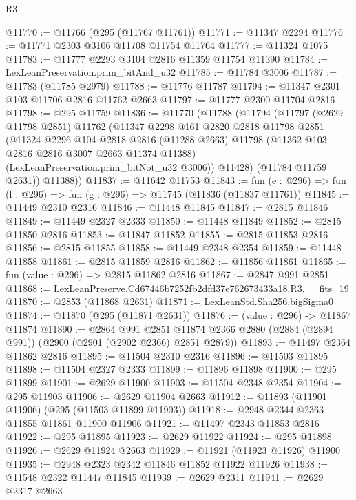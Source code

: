 \begin{lexlean}{R3}
\begin{coremodule}
@11770 := @11766 (@295 (@11767 @11761))
@11771 := @11347 @2294
@11776 := @11771 @2303 @3106 @11708 @11754 @11764
@11777 := @11324 @1075
@11783 := @11777 @2293 @3104 @2816 @11359 @11754 @11390
@11784 := LexLeanPreservation.prim_bitAnd_u32
@11785 := @11784 @3006
@11787 := @11783 (@11785 @2979)
@11788 := @11776 @11787
@11794 := @11347 @2301 @103 @11706 @2816 @11762 @2663
@11797 := @11777 @2300 @11704 @2816
@11798 := @295 @11759
@11836 := @11770
    (@11788
      (@11794
        (@11797
          (@2629 @11798 @2851)
          @11762
          (@11347
            @2298
            @161
            @2820
            @2818
            @11798
            @2851
            (@11324
              @2296
              @104
              @2818
              @2816
              (@11288 @2663)
              @11798
              (@11362 @103 @2816 @2816 @3007 @2663 @11374 @11388)
              (LexLeanPreservation.prim_bitNot_u32 @3006))
            @11428)
          (@11784 @11759 @2631))
        @11388))
@11837 := @11642 @11753
@11843 := fun (e : @296) => fun (f : @296) => fun (g : @296) => @11745 (@11836 (@11837 @11761))
@11845 := @11449 @2310 @2316
@11846 := @11448 @11845
@11847 := @2815 @11846
@11849 := @11449 @2327 @2333
@11850 := @11448 @11849
@11852 := @2815 @11850 @2816
@11853 := @11847 @11852
@11855 := @2815 @11853 @2816
@11856 := @2815 @11855
@11858 := @11449 @2348 @2354
@11859 := @11448 @11858
@11861 := @2815 @11859 @2816
@11862 := @11856 @11861
@11865 := fun (value : @296) => @2815 @11862 @2816
@11867 := @2847 @991 @2851
@11868 := LexLeanPreserve.Cd67446b7252fb2dfd37e762673433a18.R3.__fits_19
@11870 := @2853 (@11868 @2631)
@11871 := LexLeanStd.Sha256.bigSigma0
@11874 := @11870 (@295 (@11871 @2631))
@11876 := (value : @296) -> @11867 @11874
@11890 := @2864
    @991
    @2851
    @11874
    @2366
    @2880
    (@2884 (@2894 @991))
    (@2900 (@2901 (@2902 @2366) @2851 @2879))
@11893 := @11497 @2364 @11862 @2816
@11895 := @11504 @2310 @2316
@11896 := @11503 @11895
@11898 := @11504 @2327 @2333
@11899 := @11896 @11898
@11900 := @295 @11899
@11901 := @2629 @11900
@11903 := @11504 @2348 @2354
@11904 := @295 @11903
@11906 := @2629 @11904 @2663
@11912 := @11893 (@11901 @11906) (@295 (@11503 @11899 @11903))
@11918 := @2948 @2344 @2363 @11855 @11861 @11900 @11906
@11921 := @11497 @2343 @11853 @2816
@11922 := @295 @11895
@11923 := @2629 @11922
@11924 := @295 @11898
@11926 := @2629 @11924 @2663
@11929 := @11921 (@11923 @11926) @11900
@11935 := @2948 @2323 @2342 @11846 @11852 @11922 @11926
@11938 := @11548 @2322 @11447 @11845
@11939 := @2629 @2311
@11941 := @2629 @2317 @2663

\end{coremodule}
\end{lexlean}
